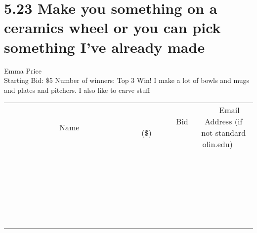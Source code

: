 \documentclass[11pt]{article}
\begin{document}
\section*{5.23 Make you something on a ceramics wheel or you can pick something I've already made}
Emma Price
\\
Starting Bid: \$5
\newline
Number of winners: Top 3 Win!
\newline
I make a lot of bowls and mugs and plates and pitchers. I also like to carve stuff
\\[6ex]
\begin{tabular}{c c c}
~~~~~~~~~~~~~Name~~~~~~~~~~~~~ & ~~~~~~~~~Bid (\$)~~~~~~~~~  & ~~~Email Address (if not standard olin.edu)~~~\\
 & & \\
\hline
 & & \\
\hline
 & & \\
\hline
 & & \\
\hline
 & & \\
\hline
 & & \\
\hline
 & & \\
\hline
 & & \\
\hline
 & & \\
\hline
 & & \\
\hline
 & & \\
\hline
 & & \\
\hline
 & & \\
\hline
 & & \\
\hline
 & & \\
\hline
 & & \\
\hline
 & & \\
\hline
 & & \\
\hline
 & & \\
\hline
 & & \\
\hline
 & & \\
\hline
 & & \\
\hline
 & & \\
\hline
 & & \\
\hline
 & & \\
\hline
 & & \\
\hline
\end{tabular}
\newpage
\end{document}
